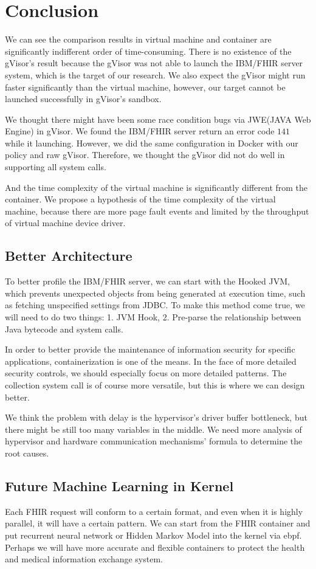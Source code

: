 \chapter{Conclusion}

We can see the comparison results in virtual machine and container are
significantly indifferent order of time-consuming. There is no existence
of the gVisor's result because the gVisor was not able to launch the
IBM/FHIR server system, which is the target of our research.
We also expect the gVisor might run faster significantly than the virtual
machine, however, our target cannot be launched successfully in
gVisor's sandbox.

We thought there might have been some race condition bugs via JWE(JAVA Web
Engine) in gVisor. We found the IBM/FHIR server return an error code $141$
while it launching. However, we did the same configuration in Docker with
our policy and raw gVisor. Therefore, we thought the gVisor did not do
well in supporting all system calls.

And the time complexity of the virtual machine is significantly different from
the container. We propose a hypothesis of the time complexity of the virtual
machine, because there are more page fault events and limited by the
throughput of virtual machine device driver\cite{10.5555/1267569.1267570,7095802}.

\section{Better Architecture}
To better profile the IBM/FHIR server, we can start with the Hooked JVM,
which prevents unexpected objects from being generated at execution time,
such as fetching unspecified settings from JDBC. To make this method come
true, we will need to do two things: 1. JVM Hook, 2. Pre-parse the relationship
between Java bytecode and system calls.

In order to better provide the maintenance of information security for specific
applications, containerization is one of the means. In the face of more detailed
security controls, we should especially focus on more detailed patterns. The
collection system call is of course more versatile, but this is where we can
design better.

We think the problem with delay is the hypervisor's driver buffer bottleneck, but
there might be still too many variables in the middle. We need more analysis of
hypervisor and hardware communication mechanisms' formula to determine the root
causes.

\section{Future Machine Learning in Kernel}
Each FHIR request will conform to a certain format, and even when it is highly
parallel, it will have a certain pattern. We can start from the FHIR container
and put recurrent neural network or Hidden Markov Model into the kernel via ebpf.
Perhaps we will have more accurate and flexible containers to protect the health
and medical information exchange system.
